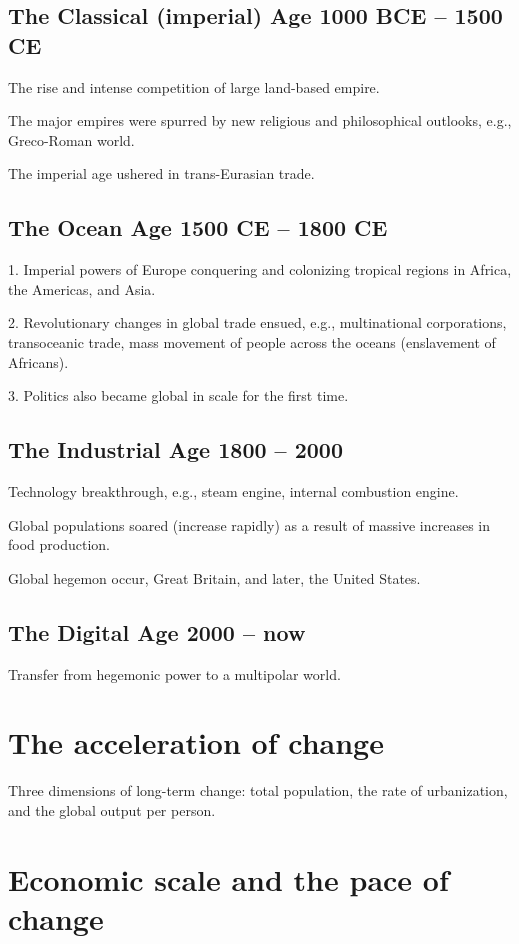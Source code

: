 \documentclass[12pt]{article}
\begin{document}
\subsection{The Classical (imperial) Age 1000 BCE -- 1500 CE}
The rise and intense competition of large land-based empire.

The major empires were spurred by new religious and philosophical 
outlooks, e.g., Greco-Roman world.

The imperial age ushered in trans-Eurasian trade.


\subsection{The Ocean Age 1500 CE -- 1800 CE}
1. Imperial powers of Europe conquering and colonizing tropical regions
in Africa, the Americas, and Asia.

2. Revolutionary changes in global trade ensued, e.g., multinational
corporations, transoceanic trade, mass movement of people across the
oceans (enslavement of Africans).

3. Politics also became global in scale for the first time.


\subsection{The Industrial Age 1800 -- 2000}

Technology breakthrough, e.g., steam engine, internal combustion engine.

Global populations soared (increase rapidly) as a result of massive
increases in food production.

Global hegemon occur, Great Britain, and later, the United States.


\subsection{The Digital Age 2000 -- now}
Transfer from hegemonic power to a multipolar world.


\section{The acceleration of change}
Three dimensions of long-term change: total population, the rate of
urbanization, and the global output per person.


\section{Economic scale and the pace of change}
\end{document}
